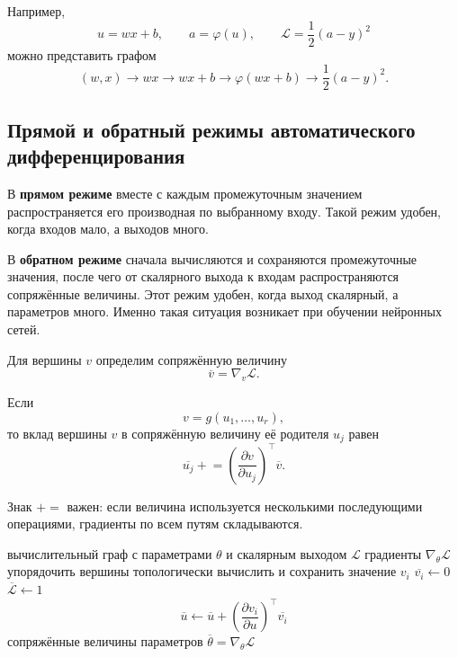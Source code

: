 \documentclass[12pt,a4paper]{article}
\theoremstyle{plain}
\theoremstyle{definition}
\theoremstyle{remark}
\begin{document}
Например,
\[
    u=wx+b,
    \qquad
    a=\varphi(u),
    \qquad
    \mathcal{L}=\frac{1}{2}(a-y)^2
\]
можно представить графом
\[
    (w,x)\longrightarrow wx
    \longrightarrow wx+b
    \longrightarrow \varphi(wx+b)
    \longrightarrow
    \frac{1}{2}(a-y)^2.
\]

\subsection{Прямой и обратный режимы автоматического
дифференцирования}

В \textbf{прямом режиме} вместе с каждым промежуточным значением
распространяется его производная по выбранному входу. Такой режим
удобен, когда входов мало, а выходов много.

В \textbf{обратном режиме} сначала вычисляются и сохраняются
промежуточные значения, после чего от скалярного выхода к входам
распространяются сопряжённые величины. Этот режим удобен, когда
выход скалярный, а параметров много. Именно такая ситуация
возникает при обучении нейронных сетей.

Для вершины $v$ определим сопряжённую величину
\[
    \overline{v}
    =
    \nabla_v\mathcal{L}.
\]

Если
\[
    v=g(u_1,\ldots,u_r),
\]
то вклад вершины $v$ в сопряжённую величину её родителя $u_j$ равен
\[
    \overline{u_j}
    \mathrel{+}=
    \left(
        \frac{\partial v}{\partial u_j}
    \right)^\top
    \overline{v}.
\]

Знак $\mathrel{+}=$ важен: если величина используется несколькими
последующими операциями, градиенты по всем путям складываются.

\begin{algorithm}[H]
\caption{Обратный режим дифференцирования вычислительного графа}
\begin{algorithmic}[1]
\Require вычислительный граф с параметрами $\theta$ и скалярным
выходом $\mathcal{L}$
\Ensure градиенты $\nabla_\theta\mathcal{L}$
\State упорядочить вершины топологически
    \State вычислить и сохранить значение $v_i$
\EndFor
{}
    \State $\overline{v_i}\gets 0$
\EndFor
\State $\overline{\mathcal{L}}\gets 1$
        \State
        \[
            \overline{u}
            \gets
            \overline{u}
            +
            \left(
                \frac{\partial v_i}{\partial u}
            \right)^\top
            \overline{v_i}
        \]
    \EndFor
\EndFor
\State \Return сопряжённые величины параметров
$\overline{\theta}=\nabla_\theta\mathcal{L}$
\end{algorithmic}
\end{algorithm}
\end{document}
